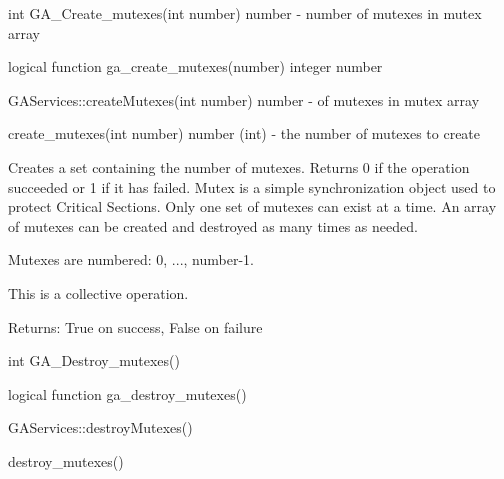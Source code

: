 \documentclass[12pt]{article}
\begin{document}

\begin{capi}
int GA_Create_mutexes(int number)
   number       - number of mutexes in mutex array                        \access{[input]} 
\end{capi}

\begin{fapi}
logical function ga_create_mutexes(number)
   integer number                                                         \access{[input]} 
\end{fapi}

\begin{cxxapi}
GAServices::createMutexes(int number)
   number       - of mutexes in mutex array                               \access{[input]}
\end{cxxapi}

\begin{pyapi}
create_mutexes(int number)  
   number (int) - the number of mutexes to create 
\end{pyapi}


\begin{desc}

Creates a set containing the number of mutexes. Returns 0 if the operation 
succeeded or 1 if it has failed. Mutex is a simple synchronization object 
used to protect Critical Sections. Only one set of mutexes can exist at a 
time. An array of mutexes can be created and destroyed as many times as needed.

Mutexes are numbered: 0, ..., number-1.

This is a collective operation.

Returns: 
True on success, False on failure 

\end{desc}


\begin{capi}
int GA_Destroy_mutexes()
\end{capi}

\begin{fapi}
logical function ga_destroy_mutexes()
\end{fapi}

\begin{cxxapi}
GAServices::destroyMutexes()
\end{cxxapi}

\begin{pyapi}
destroy_mutexes()  
\end{pyapi} 
\end{document}
